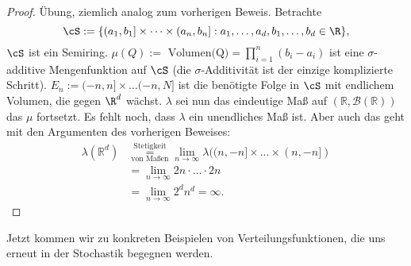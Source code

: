 \begin{proof}
	Übung, ziemlich analog zum vorherigen Beweis. Betrachte $$\cS := \{ (a_1,b_1]\times \dots \times (a_n,b_n] : a_1,\dots,a_d, b_1,\dots, b_d\in \R\},$$ $\cS$ ist ein Semiring.
		 $\mu(Q) := \text{ Volumen(Q)} = \prod\limits_{i=1}^{n}(b_i-a_i)$ ist eine $\sigma$-additive Mengenfunktion auf $\cS$ (die $\sigma$-Additivit\"at ist der einzige komplizierte Schritt). $E_n:=(-n,n]\times \dots (-n,N]$ ist die ben\"otigte Folge in $\cS$ mit endlichem Volumen, die gegen $\R^d$ w\"achst.
		 $\lambda$ sei nun das eindeutige Ma\ss{} auf $(\mathbb R, \mathcal B(\mathbb R))$ das $\mu$ fortsetzt. Es fehlt noch, dass $\lambda$ ein unendliches Ma\ss{} ist. Aber auch das geht mit den Argumenten des vorherigen Beweises:
		 \begin{align*}
		 \lambda(\mathbb{R}^d) &\overset{\text{Stetigkeit}}{\underset{\text{von Maßen}}{=}} \lim\limits_{n \to \infty}\lambda ((n,-n]\times ... \times (n,-n])\\
		 & = \lim\limits_{n \to \infty} 2n \cdot ... \cdot 2n\\
		 & = \lim\limits_{n \to \infty} 2^d n^d = \infty.
		 \end{align*}
		 
\end{proof}
Jetzt kommen wir zu konkreten Beispielen von Verteilungsfunktionen, die uns erneut in der Stochastik begegnen werden.
